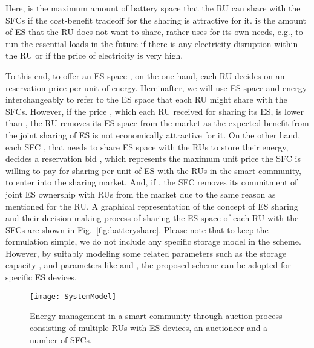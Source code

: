 \documentclass[journal,10pt]{IEEEtran}
\begin{document}
Here,  is the maximum amount of battery space that the RU can share with the SFCs if the cost-benefit tradeoff for the sharing is attractive for it.  is the amount of ES that the RU does not want to share, rather uses for its own needs, e.g., to run the essential loads in the future if there is any electricity disruption within the RU or if the price of electricity is very high.

To this end, to offer an ES space , on the one hand, each RU  decides on an reservation price  per unit of energy. Hereinafter, we will use ES space and energy interchangeably to refer to the ES space that each RU might share with the SFCs. However, if the price , which each RU received for sharing its ES, is lower than , the RU  removes its ES space  from the market as the expected benefit from the joint sharing of ES is not economically attractive for it. On the other hand, each SFC , that needs to share ES space with the RUs to store their energy, decides a reservation bid , which represents the maximum unit price the SFC  is willing to pay for sharing per unit of ES with the RUs in the smart community, to enter into the sharing market. And, if , the SFC removes its commitment of joint ES ownership with RUs from the market due to the same reason as mentioned for the RU. A graphical representation of the concept of ES sharing and their decision making process of sharing the ES space of each RU  with the SFCs are shown in Fig.~\ref{fig:batteryshare}. Please note that to keep the formulation simple, we do not include any specific storage model in the scheme. However, by suitably modeling some related parameters such as the storage capacity , and parameters like  and , the proposed scheme can be adopted for specific ES devices.
\begin{figure}[t]
\centering
\texttt{[image: SystemModel]}
\caption{Energy management in a smart community through auction process consisting of multiple RUs with ES devices, an auctioneer and a number of SFCs.} \label{fig:system_model}
\end{figure}
\end{document}
